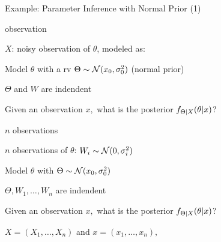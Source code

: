 




\begin{frame}{Example: Parameter Inference with Normal Prior (1)}


  {
    \plitemsep 0.07in
    \bci
    
  \item<6->  observation

  \item<2-> $X$: noisy observation of $\theta$, modeled as:


  \item<3-> Model $\theta$ with a rv $\Theta \sim \mathcal N(x_0,\sigma_0^2)$
    (normal prior)
  \item<4-> $\Theta$ and $W$ are indendent
    
  \item<5-> \question Given an observation $x,$ what is the posterior $f_{\Theta|X}(\theta|x)$?
      
    \eci
  }
  {
    \plitemsep 0.03in
    \bci
    
  \item<6->  $n$ observations

  \item<7-> $n$ observations of $\theta$: $W_i \sim \mathcal N(0,\sigma_i^2)$
\vspace{-0.6cm}
\item<8-> Model $\theta$ with $\Theta \sim \mathcal N(x_0,\sigma_0^2)$
  \item<8-> $\Theta, W_1, \ldots, W_n$ are indendent
    
  \item<9-> \question Given an observation $x,$ what is
    the posterior $f_{\Theta|X}(\theta|x)$? 
\bci
    \item $X = (X_1, \ldots, X_n)$ and $x=(x_1, \ldots, x_n),$      
\eci
    \eci

  }


\end{frame}

